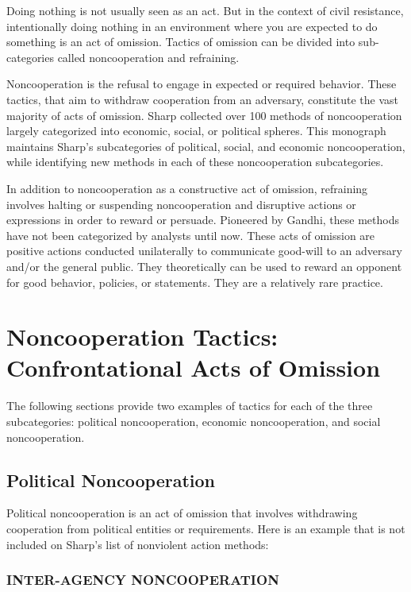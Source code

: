 \documentclass[twoside,a4paper,12pt,fleqn,openany]{extbook}
\begin{document}
Doing nothing is not usually seen as an act. But in the context of civil resistance, intentionally doing nothing in an environment where you are expected to do something is an act of omission. Tactics of omission can be divided into sub-categories called noncooperation and refraining.

Noncooperation is the refusal to engage in expected or required behavior. These tactics, that aim to withdraw cooperation from an adversary, constitute the vast majority of acts of omission. Sharp collected over 100 methods of noncooperation largely categorized into economic, social, or political spheres. This monograph maintains Sharp’s subcategories of political, social, and economic noncooperation, while identifying new methods in each of these noncooperation subcategories.

In addition to noncooperation as a constructive act of omission, refraining involves halting or suspending noncooperation and disruptive actions or expressions in order to reward or persuade. Pioneered by Gandhi, these methods have not been categorized by analysts until now. These acts of omission are positive actions conducted unilaterally to communicate good-will to an adversary and/or the general public. They theoretically can be used to reward an opponent for good behavior, policies, or statements. They are a relatively rare practice.

\section*{Noncooperation Tactics: Confrontational Acts of Omission}

The following sections provide two examples of tactics for each of the three subcategories: political noncooperation, economic noncooperation, and social noncooperation.

\subsection*{Political Noncooperation}

Political noncooperation is an act of omission that involves withdrawing cooperation from political entities or requirements. Here is an example that is not included on Sharp’s list of nonviolent action methods:

\subsubsection*{INTER-AGENCY NONCOOPERATION}
\end{document}

